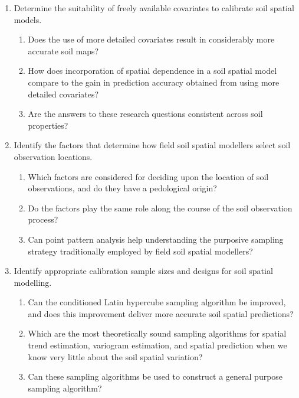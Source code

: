 \begin{enumerate}[label=(\Roman*)]
 \item Determine the suitability of freely available covariates to calibrate soil spatial models.
  \begin{enumerate}[label=(\alph*)]
   \item Does the use of more detailed covariates result in considerably more accurate soil maps?
   \item How does incorporation of spatial dependence in a soil spatial model compare to the gain in 
   prediction accuracy obtained from using more detailed covariates?
   \item Are the answers to these research questions consistent across soil properties?
  \end{enumerate}
 
 \item Identify the factors that determine how field soil spatial modellers select soil observation locations.
  \begin{enumerate}[label=(\alph*)]
   \item Which factors are considered for deciding upon the location of soil observations, and do they have a 
   pedological origin?
   \item Do the factors play the same role along the course of the soil observation process?
   \item Can point pattern analysis help understanding the purposive sampling strategy traditionally employed
   by field soil spatial modellers?
  \end{enumerate}

\item Identify appropriate calibration sample sizes and designs for soil spatial modelling.
\begin{enumerate}[label=(\alph*)]
\item Can the conditioned Latin hypercube sampling algorithm be improved, and does this improvement deliver 
more accurate soil spatial predictions?
\item Which are the most theoretically sound sampling algorithms for spatial trend estimation, variogram 
estimation, and spatial prediction when we know very little about the soil spatial variation?
\item Can these sampling algorithms be used to construct a general purpose sampling algorithm?


\end{enumerate}
\end{enumerate}
